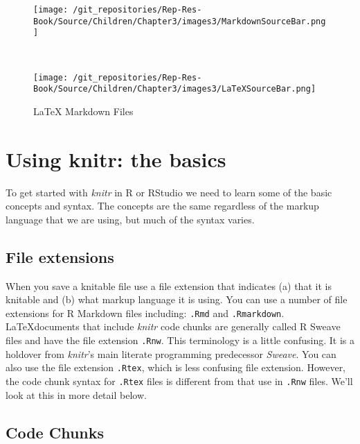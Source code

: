 \documentclass[ChapterTOCs,krantz1]{krantz}\usepackage{graphicx, color}
\begin{document}
{\begin{figure}[ht]
\begin{center}
        \begin{subfigure}
            \caption{R Markdown Files}
            \texttt{[image: /git\_repositories/Rep-Res-Book/Source/Children/Chapter3/images3/MarkdownSourceBar.png]}
        \end{subfigure}\\[0.5cm]
        
        \begin{subfigure}
            \caption{LaTeX Markdown Files}
            \texttt{[image: /git\_repositories/Rep-Res-Book/Source/Children/Chapter3/images3/LaTeXSourceBar.png]}
        \end{subfigure}
        
    \end{center}
\end{figure}



\section{Using knitr: the basics}

To get started with {\emph{knitr}} in R or RStudio we need to learn some of the basic concepts and syntax. The concepts are the same regardless of the markup language that we are using, but much of the syntax varies.

\subsection{File extensions}

When you save a knitable file use a file extension that indicates (a) that it is knitable and (b) what markup language it is using. You can use a number of file extensions for R Markdown files including: \texttt{.Rmd} and \texttt{.Rmarkdown}. \LaTeX documents that include {\emph{knitr}} code chunks are generally called R Sweave files and have the file extension {\tt{.Rnw}}. This terminology is a little confusing. It is a holdover from {\emph{knitr}}'s main literate programming predecessor {\emph{Sweave}}.\cite{Leisch2002} You can also use the file extension \texttt{.Rtex}, which is less confusing file extension. However, the code chunk syntax for \texttt{.Rtex} files is different from that use in \texttt{.Rnw} files. We'll look at this in more detail below.

\subsection{Code Chunks}

}
\end{document}
